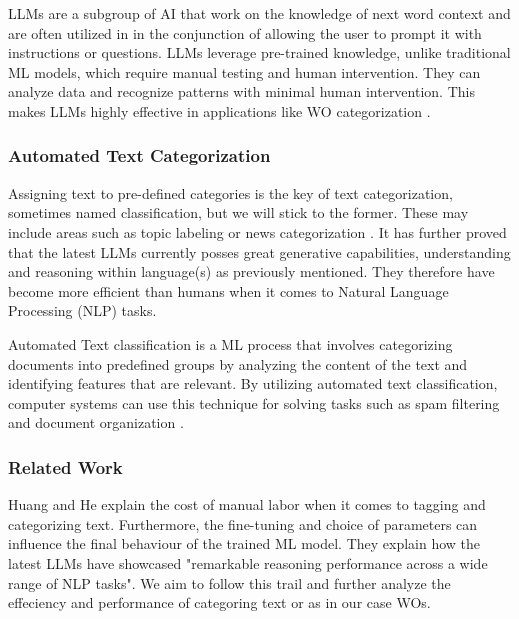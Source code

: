 \documentclass{article}
\begin{document}
LLMs are a subgroup of AI that work on the knowledge of next word context and are often utilized in
in the conjunction of allowing the user to prompt it with instructions or questions.
LLMs leverage pre-trained knowledge, unlike traditional ML models, which require manual testing and human intervention.
They can analyze data and recognize patterns with minimal human intervention.
This makes LLMs highly effective in applications like WO categorization \cite{andersson2024}.

\subsubsection{Automated Text Categorization}

Assigning text to pre-defined categories is the key of text categorization,
sometimes named classification, but we will stick to the former.
These may include areas such as topic labeling or news categorization \cite{zhang2024}.
It has further proved that the latest LLMs currently posses great generative capabilities,
understanding and reasoning within language(s) as previously mentioned.
They therefore have become more efficient than humans when it comes to Natural Language Processing (NLP) tasks.

Automated Text classification is a ML process that involves categorizing documents
into predefined groups by analyzing the content of the text and identifying features that are relevant.
By utilizing automated text classification, computer systems can use this technique for solving tasks such as spam filtering and document organization \cite{dalal2011}.

\subsubsection{Related Work}

Huang and He \cite{huang2024} explain the cost of manual labor when it comes to tagging and categorizing text.
Furthermore, the fine-tuning and choice of parameters can influence the final behaviour of the trained ML model.
They explain how the latest LLMs have showcased "remarkable reasoning performance across a wide range of
NLP tasks".
We aim to follow this trail and further analyze the effeciency and performance of categoring text or as in our
case WOs.
\end{document}
